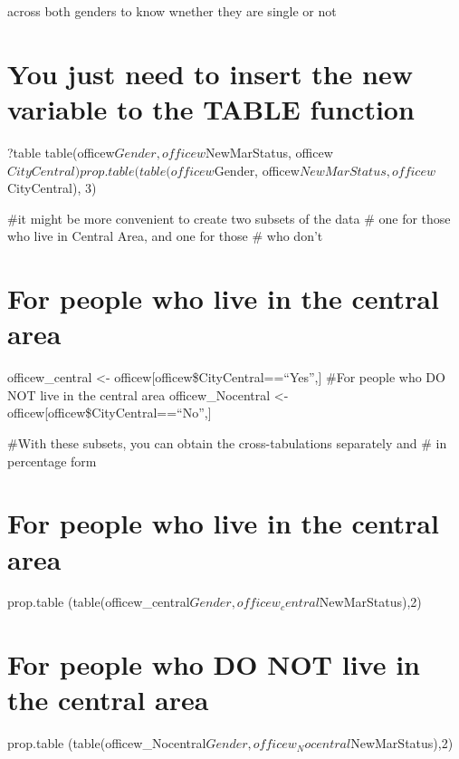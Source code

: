 \documentclass[
]{article}
\begin{document}
across both genders to know wnether they are single or not

\hypertarget{you-just-need-to-insert-the-new-variable-to-the-table-function}{%
\section{You just need to insert the new variable to the TABLE
function}\label{you-just-need-to-insert-the-new-variable-to-the-table-function}}

?table table(officew\(Gender, officew\)NewMarStatus,
officew\(CityCentral) prop.table (table(officew\)Gender,
officew\(NewMarStatus, officew\)CityCentral), 3)

\#it might be more convenient to create two subsets of the data \# one
for those who live in Central Area, and one for those \# who don't

\hypertarget{for-people-who-live-in-the-central-area}{%
\section{For people who live in the central
area}\label{for-people-who-live-in-the-central-area}}

officew\_central \textless- officew{[}officew\$CityCentral==``Yes'',{]}
\#For people who DO NOT live in the central area officew\_Nocentral
\textless- officew{[}officew\$CityCentral==``No'',{]}

\#With these subsets, you can obtain the cross-tabulations separately
and \# in percentage form

\hypertarget{for-people-who-live-in-the-central-area-1}{%
\section{For people who live in the central
area}\label{for-people-who-live-in-the-central-area-1}}

prop.table
(table(officew\_central\(Gender, officew_central\)NewMarStatus),2)

\hypertarget{for-people-who-do-not-live-in-the-central-area}{%
\section{For people who DO NOT live in the central
area}\label{for-people-who-do-not-live-in-the-central-area}}

prop.table
(table(officew\_Nocentral\(Gender, officew_Nocentral\)NewMarStatus),2)
\end{document}
